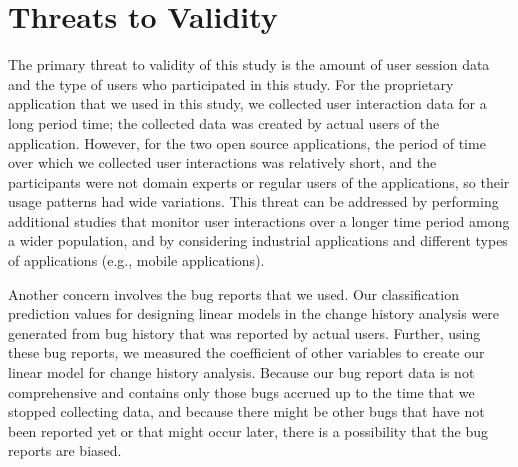 \section{Threats to Validity}
\label{sec:validity}

The primary threat to validity of this study is the amount of
user session data and the type of users who participated in this
study. For the proprietary application that we used in this study,
we collected user interaction data for a long period time; 
the collected data was created by actual users of 
the application. However, for the two open source applications, 
the period of time over which we collected user interactions was relatively 
short, and the participants were not domain experts or regular users 
of the applications, so their usage patterns had wide variations.
This threat can be addressed by performing additional studies that
monitor user interactions over a longer time period among a wider population,
and by considering industrial applications and different types of 
applications (e.g., mobile applications).
 

Another concern involves the bug reports that we used.
Our classification prediction values for designing linear models 
in the change history analysis were generated from bug history that 
was reported by actual users.
Further, using these bug reports, we measured the coefficient of other 
variables to create our linear model for change history analysis.
Because our bug report data is not comprehensive and contains 
only those bugs accrued 
up to the time that we stopped collecting data, 
and because there might 
be other bugs that have not been reported yet or that might occur 
later, there is a possibility that the bug reports are biased.

